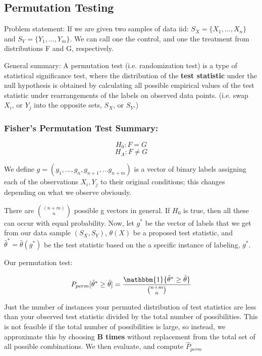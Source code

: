	\subsection{Permutation Testing}

		Problem statement: If we are given two samples of data iid: $S_X = \{X_1,...,X_n\}$ and $S_Y = \{Y_1,...,Y_m\}$. We can call one the control, and one the treatment from distributions F and G, respectively. 

		General summary: 
		A permutation test (i.e. randomization test) is a type of statistical significance test, where the distribution of the \textbf{test statistic} under the null hypothesis is obtained by calculating all possible empirical values of the test statistic under rearrangements of the labels on observed data points. (i.e. swap $X_i$, or $Y_j$ into the opposite sets, $S_X$, or $S_Y$.)

		\subsubsection{Fisher's Permutation Test Summary:}

			$$H_0 : F = G$$
			$$H_A : F \neq G$$

			We define $g = (g_1, ..., g_n, g_{n+1}, ... g_{n+m})$ is a vector of binary labels assigning each of the observations $X_i,Y_j$ to their original conditions; this changes depending on what we observe obviously. 

			There are $\binom{(n+m)}{n}$ possible g vectors in general. If $H_0$ is true, then all these can occur with equal probability. Now, let $g^*$ be the vector of labels that we get from our data sample $(S_X, S_Y)$, $\theta(X)$ be a proposed test statistic, and $\hat{\theta}^* = \hat{\theta}(g^*)$ be the test statistic based on the a specific instance of labeling, $g^*$.

			Our permutation test:

			$$P_{perm} [ \hat{\theta}^* \ge \hat{\theta}] = \frac{\mathbbm{1} \{\hat{\theta}^* \ge \hat{\theta} \}}{\binom{n+m}{n}}$$

			Just the number of instances your permuted distribution of test statistics are less than your observed test statistic divided by the total number of possibilities. This is not feasible if the total number of possibilities is large, so instead, we approximate this by choosing \textbf{B times} without replacement from the total set of all possible combinations. We then evaluate, and compute $\hat{P}_{perm}$

